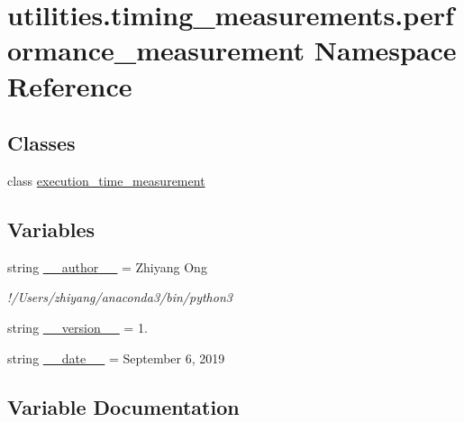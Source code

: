 \hypertarget{namespaceutilities_1_1timing__measurements_1_1performance__measurement}{}\section{utilities.\+timing\+\_\+measurements.\+performance\+\_\+measurement Namespace Reference}
\label{namespaceutilities_1_1timing__measurements_1_1performance__measurement}
\subsection*{Classes}
\begin{DoxyCompactItemize}
\item 
class \hyperlink{classutilities_1_1timing__measurements_1_1performance__measurement_1_1execution__time__measurement}{execution\+\_\+time\+\_\+measurement}
\end{DoxyCompactItemize}
\subsection*{Variables}
\begin{DoxyCompactItemize}
\item 
string \hyperlink{namespaceutilities_1_1timing__measurements_1_1performance__measurement_ae9ebc6598ae207bada8114a41262cd98}{\+\_\+\+\_\+author\+\_\+\+\_\+} = \textquotesingle{}Zhiyang Ong\textquotesingle{}
\begin{DoxyCompactList}\small\item\em !/\+Users/zhiyang/anaconda3/bin/python3 \end{DoxyCompactList}\item 
string \hyperlink{namespaceutilities_1_1timing__measurements_1_1performance__measurement_acaa159634d0efe832d19c3272a52ee1f}{\+\_\+\+\_\+version\+\_\+\+\_\+} = \textquotesingle{}1.\textquotesingle{}
\item 
string \hyperlink{namespaceutilities_1_1timing__measurements_1_1performance__measurement_a7d7385628a9772dfe4b0d7ff51942c6a}{\+\_\+\+\_\+date\+\_\+\+\_\+} = \textquotesingle{}September 6, 2019\textquotesingle{}
\end{DoxyCompactItemize}


\subsection{Variable Documentation}
\hypertarget{namespaceutilities_1_1timing__measurements_1_1performance__measurement_ae9ebc6598ae207bada8114a41262cd98}{}
